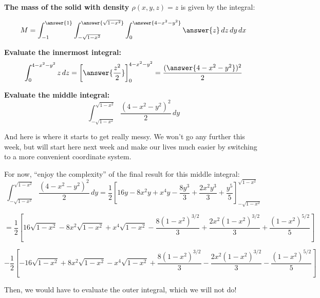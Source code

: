 \documentclass{ximera}
\begin{document}
\begin{problem}
\textbf{The mass of the solid with density $\rho(x,y,z) = z$} is given by the integral: 

$$M = \int_{-1}^{\answer{1}} \int_{-\sqrt{1-x^2}}^{\answer{\sqrt{1-x^2}}} \int_0^{\answer{4-x^2-y^2}} \answer{z}\,dz\,dy\,dx$$

\textbf{Evaluate the innermost integral:}
$$\int_0^{4-x^2-y^2} z\,dz = \left[\answer{\frac{z^2}{2}}\right]_0^{4-x^2-y^2} = \frac{(\answer{4-x^2-y^2})^2}{2}$$

\textbf{Evaluate the middle integral:}
$$\int_{-\sqrt{1-x^2}}^{\sqrt{1-x^2}} \frac{(4-x^2-y^2)^2}{2}\,dy$$

And here is where it starts to get really messy. We won't go any further this week, but will start here next week and make our lives much easier by switching to a more convenient coordinate system.

For now, ``enjoy the complexity'' of the final result for this middle integral:
$$\int_{-\sqrt{1-x^2}}^{\sqrt{1-x^2}} \frac{(4-x^2-y^2)^2}{2}\,dy = \frac{1}{2}\left[16y - 8x^2y + x^4y - \frac{8y^3}{3} + \frac{2x^2y^3}{3} + \frac{y^5}{5}\right]_{-\sqrt{1-x^2}}^{\sqrt{1-x^2}}$$


$$= \frac{1}{2}\left[16\sqrt{1-x^2} - 8x^2\sqrt{1-x^2} + x^4\sqrt{1-x^2} - \frac{8(1-x^2)^{3/2}}{3} + \frac{2x^2(1-x^2)^{3/2}}{3} + \frac{(1-x^2)^{5/2}}{5}\right]$$

$$- \frac{1}{2}\left[-16\sqrt{1-x^2} + 8x^2\sqrt{1-x^2} - x^4\sqrt{1-x^2} + \frac{8(1-x^2)^{3/2}}{3} - \frac{2x^2(1-x^2)^{3/2}}{3} - \frac{(1-x^2)^{5/2}}{5}\right]$$

Then, we would have to evaluate the outer integral, which we will not do!
 
\end{problem}






\end{document}
